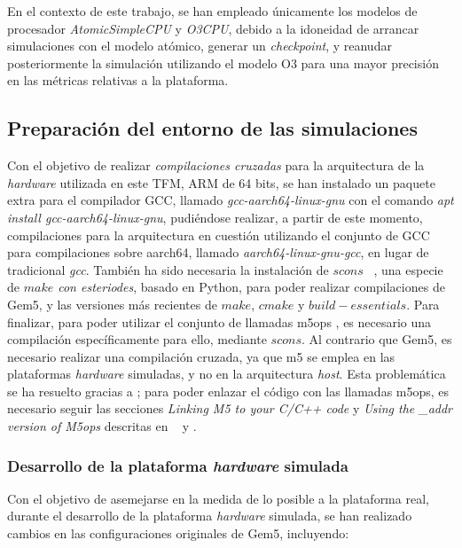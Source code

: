 En el contexto de este trabajo, se han empleado únicamente los modelos de procesador \textit{AtomicSimpleCPU} y \textit{O3CPU}, debido a la idoneidad de arrancar simulaciones con el modelo atómico, generar un \textit{checkpoint}, y reanudar posteriormente la simulación utilizando el modelo \ac{O3} para una mayor precisión en las métricas relativas a la plataforma. 

\subsection{Preparación del entorno de las simulaciones}
\label{subs:despliegueGem5}

Con el objetivo de realizar \emph{compilaciones cruzadas} para la arquitectura de la \textit{hardware} utilizada en este \ac{TFM}, \ac{ARM} de 64 bits, se han instalado un paquete extra para el compilador \ac{GCC}, llamado \emph{gcc-aarch64-linux-gnu} con el comando \emph{apt install gcc-aarch64-linux-gnu}, pudiéndose realizar, a partir de este momento, compilaciones para la arquitectura en cuestión utilizando el conjunto de GCC para compilaciones sobre aarch64, llamado \emph{aarch64-linux-gnu-gcc}, en lugar de tradicional \emph{gcc}. También ha sido necesaria la instalación de $scons$ ~\cite{scons-doc}, una especie de \textit{$make$ con esteriodes}, basado en Python, para poder realizar compilaciones de Gem5, y las versiones más recientes de $make$, $cmake$ y $build-essentials$. Para finalizar, para poder utilizar el conjunto de llamadas m5ops \cite{m5ops-documentacion}, es necesario una compilación específicamente para ello, mediante $scons$. Al contrario que Gem5, es necesario realizar una compilación cruzada, ya que m5 se emplea en las plataformas \textit{hardware} simuladas, y no en la arquitectura \textit{host}. Esta problemática se ha resuelto gracias a \cite{m5ops-documentacion2}; para poder enlazar el código con las llamadas m5ops, es necesario seguir las secciones \textit{Linking M5 to your C/C++ code} y \textit{Using the \_addr version of M5ops} descritas en ~\cite{m5ops-documentacion} y \cite{m5ops-documentacion2}.

\subsubsection{Desarrollo de la plataforma \textit{hardware} simulada}


Con el objetivo de asemejarse en la medida de lo posible a la plataforma real, durante el desarrollo de la plataforma \textit{hardware} simulada, se han realizado cambios en las configuraciones originales de Gem5, incluyendo:

